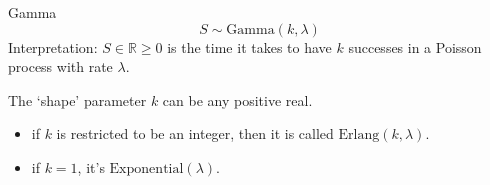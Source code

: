 \documentclass{article}
\theoremstyle{definition}
\begin{document}
\begin{kast}{Gamma}
  \begin{equation}
    S \sim \mathrm{Gamma}(k,\lambda)
  \end{equation}
  Interpretation: $S\in \mathbb{R} \ge 0$ is the time it takes to have $k$
  successes in a Poisson process with rate $\lambda$. 

  The `shape' parameter $k$ can be any positive real.
  \begin{itemize}
    \item if $k$ is restricted to be an integer, then it is called
      $\mathrm{Erlang}(k,\lambda)$.
    \item if $k=1$, it's $\mathrm{Exponential}(\lambda)$.
  \end{itemize}
\end{kast}

\nocite{leemis.l:2008,crooks.g:2019}
\printbibliography[title=References]{}
\end{document}

